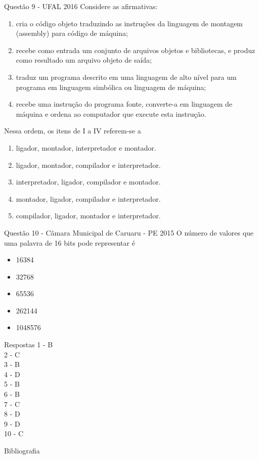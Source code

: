 \documentclass[aspectratio=169,
				xcolor=table]{beamer}
\begin{document}
	\begin{frame}[allowframebreaks]{Questão 9 - UFAL 2016}
		Considere as afirmativas:
		
		\begin{enumerate}[I]
			\item cria o código objeto traduzindo as instruções da linguagem de montagem (assembly) para código de máquina;
			\item recebe como entrada um conjunto de arquivos objetos e bibliotecas, e produz como resultado um arquivo objeto de saída;
			\item traduz um programa descrito em uma linguagem de alto nível para um programa em linguagem simbólica ou linguagem de máquina;
			\item recebe uma instrução do programa fonte, converte-a em linguagem de máquina e ordena ao computador que execute esta instrução.

		\end{enumerate}
		\framebreak
		Nessa ordem, os itens de I a IV referem-se a  
		\begin{enumerate}[A]
			\item ligador, montador, interpretador e montador.  
			\item ligador, montador, compilador e interpretador.  
			\item interpretador, ligador, compilador e montador.  
			\item montador, ligador, compilador e interpretador.  
			\item compilador, ligador, montador e interpretador. 
		\end{enumerate}
	\end{frame}

	\begin{frame}{Questão 10 - Câmara Municipal de Caruaru - PE 2015}
		O número de valores que uma palavra de 16 bits pode representar é 
		\begin{itemize}
			\item 16384
			\item 32768
			\item 65536
			\item 262144
			\item 1048576 
		\end{itemize}

	\end{frame}
	
	\begin{frame}{Respostas}
		1 - B \\
		2 - C \\
		3 - B \\
		4 - D \\
		5 - B \\
		6 - B \\
		7 - C \\
		8 - D \\
		9 - D \\
		10 - C
	\end{frame}
	
	\begin{frame}{Bibliografia}
		\nocite{Englander2011}
		\nocite{Paixao2014}
		\nocite{Stallings2010}
    	
    	   	
	
	\end{frame}
	
	\begin{frame}{}
			
		\end{frame}	
\end{document}
